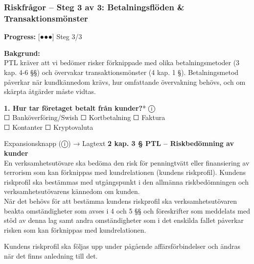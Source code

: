 \documentclass[10pt]{beamer}
\begin{document}
\begin{frame}[label=riskfragor-steg3]
  \frametitle{Riskfrågor – Steg 3 av 3: Betalningsflöden \& Transaktionsmönster}

  \begin{center}
    \textbf{Progress:} [●●●] Steg 3/3
  \end{center}

  \vspace{0.3cm}

  \footnotesize
  
  \textbf{Bakgrund:}\\
  \tiny PTL kräver att vi bedömer risker förknippade med olika betalningsmetoder (3 kap. 4-6 §§) 
  och övervakar transaktionsmönster (4 kap. 1 §). Betalningsmetod påverkar när kundkännedom krävs, 
  hur omfattande övervakning behövs, och om skärpta åtgärder måste vidtas.

  \vspace{0.4cm}

  \textbf{1. Hur tar företaget betalt från kunder?}* \hspace{0.3cm} ⓘ\\
  ☐ Banköverföring/Swish \hspace{0.3cm} ☐ Kortbetalning \hspace{0.3cm} ☐ Faktura\\
  ☐ Kontanter \hspace{0.3cm} ☐ Kryptovaluta
  \begin{alertblock}{Expansionsknapp (ⓘ) → Lagtext}
    \tiny \textbf{2 kap. 3 § PTL – Riskbedömning av kunder}\\
    \tiny En verksamhetsutövare ska bedöma den risk för penningtvätt eller finansiering av terrorism som kan
    förknippas med kundrelationen (kundens riskprofil). Kundens riskprofil ska bestämmas med utgångspunkt 
    i den allmänna riskbedömningen och verksamhetsutövarens kännedom om kunden.\\

    När det behövs för att bestämma kundens riskprofil ska verksamhetsutövaren beakta omständigheter 
    som avses i 4 och 5 §§ och föreskrifter som meddelats med stöd av denna lag samt andra omständigheter 
    som i det enskilda fallet påverkar risken som kan förknippas med kundrelationen.

    Kundens riskprofil ska följas upp under pågående affärsförbindelser och ändras när det finns 
    anledning till det.\\[0.1cm]


\end{alertblock}
\end{frame}
\end{document}
